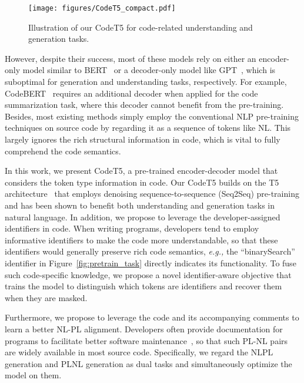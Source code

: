 \documentclass[11pt]{article}
\newcommand{\eg}{{\em e.g.,}\xspace}
\begin{document}
\begin{figure*}[t]
\centering
\texttt{[image: figures/CodeT5\_compact.pdf]}
\vspace{-0.5em}
\caption{Illustration of our CodeT5 for code-related understanding and generation  tasks.}\label{fig:finetune_task}
\vspace{-1em}
\end{figure*}



 
However, despite their success, most of these models rely on either an encoder-only model similar to BERT~\cite{DBLP:conf/sigsoft/SvyatkovskiyDFS20,DBLP:conf/emnlp/FengGTDFGS0LJZ20} or a decoder-only model like GPT~\cite{DBLP:conf/icml/KanadeMBS20}, which is suboptimal for generation and understanding tasks, respectively. For example, CodeBERT~\cite{DBLP:conf/emnlp/FengGTDFGS0LJZ20} requires an additional decoder when applied for the code summarization task, where this decoder cannot benefit from the pre-training. 
Besides, most existing methods simply employ the conventional NLP pre-training techniques on source code by regarding it as a sequence of tokens like NL. This largely ignores the rich structural information in code, which is vital to fully comprehend the  code semantics.


In this work, we present CodeT5, a pre-trained encoder-decoder model  that  considers the token type information in code.
Our CodeT5 builds on the T5 architecture~\cite{DBLP:journals/jmlr/RaffelSRLNMZLL20} that employs denoising sequence-to-sequence (Seq2Seq) pre-training and has been shown to benefit both understanding and generation tasks in natural language.
In addition, we propose to leverage the  developer-assigned identifiers in code.
When writing programs, developers tend to employ informative identifiers to make the code more understandable, so that these identifiers would generally preserve rich code semantics, \eg the ``binarySearch'' identifier in Figure~\ref{fig:pretrain_task} directly indicates its functionality. To fuse such code-specific knowledge, we propose a novel identifier-aware objective that trains the model to  distinguish which tokens are identifiers and recover them when they are masked.


Furthermore, we propose to leverage the code and its accompanying comments to learn a better NL-PL alignment. Developers often provide documentation for programs to facilitate better software maintenance~\cite{DBLP:conf/sigdoc/SouzaAO05}, so that such PL-NL pairs are widely available in most source code. Specifically, we regard the NLPL generation and   PLNL generation as dual tasks and simultaneously optimize the model on them. 
\end{document}
